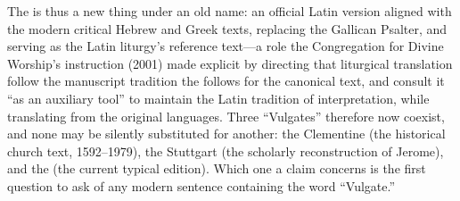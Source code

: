 The  is thus a new thing under an old name: an
official Latin version aligned with the modern critical Hebrew and Greek
texts, replacing the Gallican Psalter, and serving as the Latin liturgy's
reference text---a role the Congregation for Divine Worship's
instruction  (2001) made explicit by
directing that liturgical translation follow the manuscript tradition
the  follows for the canonical text, and consult it
``as an auxiliary tool'' to maintain the Latin tradition of
interpretation, while translating from the original
languages. Three ``Vulgates'' therefore now
coexist, and none may be silently substituted for another: the
Clementine (the historical church text, 1592--1979), the Stuttgart
(the scholarly reconstruction of Jerome), and the 
(the current typical edition). Which one a claim concerns is the first
question to ask of any modern sentence containing the word
``Vulgate.''
